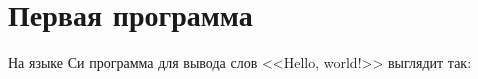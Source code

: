 \section{Первая программа}

На языке Си программа для вывода слов <<Hello, world!>> выглядит так:


